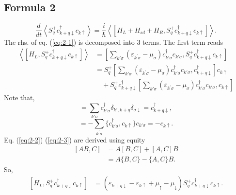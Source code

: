 \documentclass[aps,prb,superscriptaddress]{revtex4-2}
\begin{document}
\subsection{Formula 2}
\begin{equation}
\frac{d}{d t}\left\langle S_{q}^{+} c_{k+q \downarrow}^{\dagger} c_{k \uparrow}\right\rangle=\frac{i}{\hbar}\left\langle\left[H_{L}+H_{s d}+H_{R}, S_{q}^{+} c_{k+q \downarrow}^{\dagger} c_{k \uparrow}\right]\right\rangle.
\label{eq:2-1}
\end{equation}
The rhs. of eq. (\ref{eq:2-1}) is decomposed into 3 terms. The first term reads
\begin{equation}
\begin{split}
\left\langle\left[H_{L}, S_{q}^{+} c_{k+q \downarrow}^{\dagger} c_{k \uparrow}\right]\right\rangle &= [\sum_{k'\sigma}\left(\varepsilon_{k^{\prime}\sigma}-\mu_{\sigma}\right) c_{k' \sigma}^{\dagger} c_{k' \sigma}, S_{q}^{+} c_{k+q \downarrow}^{\dagger} c_{k \uparrow}] \\
&= S_{q}^{+} [\sum_{k'\sigma}\left(\varepsilon_{k^{\prime}\sigma}-\mu_{\sigma}\right) c_{k' \sigma}^{\dagger} c_{k' \sigma}, c_{k+q \downarrow}^{\dagger}]c_{k \uparrow} \\
&\quad + S_{q}^{+}c_{k+q \downarrow}^{\dagger}[\sum_{k'\sigma}\left(\varepsilon_{k^{\prime}\sigma}-\mu_{\sigma}\right) c_{k' \sigma}^{\dagger} c_{k' \sigma}, c_{k \uparrow}]
\end{split}
\end{equation}
Note that,
\begin{equation}
[\sum_{k^{\prime} \sigma} c_{k^{\prime} \sigma}^{\dag} c_{k^{\prime} \sigma}, c_{k+q \downarrow}^{\dagger}] = \sum_{k'\sigma} c_{k'\sigma}^{\dag}\delta_{k',k+q}\delta_{\sigma\downarrow} = c_{k+q\downarrow}^{\dag},
\label{eq:2-2}
\end{equation}
\begin{equation}
[\sum_{k^{\prime} \sigma} c_{k^{\prime} \sigma}^{\dag} c_{k^{\prime} \sigma}, c_{k \uparrow}] = - \sum_{k^{\prime} \sigma} \{c_{k'\sigma}^{\dag}, c_{k\uparrow}\}c_{k'\sigma} = - c_{k\uparrow}.
\label{eq:2-3}
\end{equation}
Eq. (\ref{eq:2-2}) (\ref{eq:2-3}) are derived using equity
\begin{equation}
\begin{split}
[AB, C] &= A[B, C] + [A, C]B \\
&= A\{B, C\} - \{A, C\}B.
\end{split}
\end{equation}
So,
\begin{equation}
\begin{split}
\left[H_{L}, S_{q}^{+} c_{k+q \downarrow}^{\dagger} c_{k \uparrow}\right] &= \left(\varepsilon_{k+q \downarrow}-\varepsilon_{k \uparrow}+\mu_{\uparrow}-\mu_{\downarrow}\right)S_{q}^{+} c_{k+q \downarrow}^{\dagger} c_{k \uparrow}.
\end{split}
\label{eq:1-0}
\end{equation}
\end{document}
